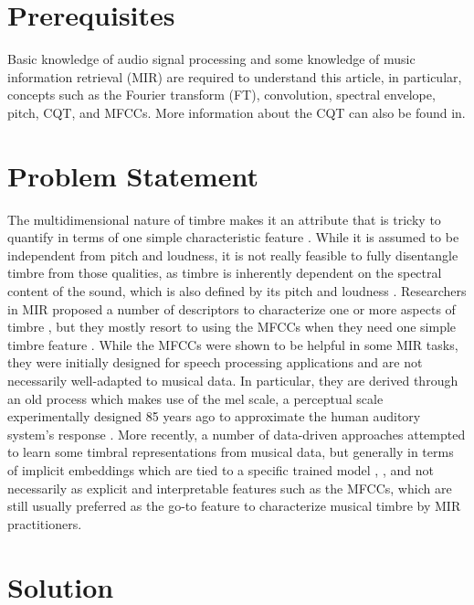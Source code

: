 \documentclass[journal]{IEEEtran}
\begin{document}
\section{Prerequisites}

Basic knowledge of audio signal processing and some knowledge of music information retrieval (MIR) \cite{mueller2007} are required to understand this article, in particular, concepts such as the Fourier transform (FT), convolution, spectral envelope, pitch, CQT, and MFCCs. More information about the CQT can also be found in\cite{brown1991, brown1992}.


\section{Problem Statement}

The multidimensional nature of timbre makes it an attribute that is tricky to quantify in terms of one simple characteristic feature \cite{grey1977}. While it is assumed to be independent from pitch and loudness, it is not really feasible to fully disentangle timbre from those qualities, as timbre is inherently dependent on the spectral content of the sound, which is also defined by its pitch and loudness \cite{moore2004}. Researchers in MIR proposed a number of descriptors to characterize one or more aspects of timbre \cite{peeters2011}, but they mostly resort to using the MFCCs when they need one simple timbre feature \cite{mueller2007}. While the MFCCs were shown to be helpful in some MIR tasks, they were initially designed for speech processing applications \cite{mermelstein1976} and are not necessarily well-adapted to musical data. In particular, they are derived through an old process which makes use of the mel scale, a perceptual scale experimentally designed 85 years ago to approximate the human auditory system's response \cite{stevens1937}. More recently, a number of data-driven approaches attempted to learn some timbral representations from musical data, but generally in terms of implicit embeddings which are tied to a specific trained model \cite{engel2017}, \cite{pons2017}, and not necessarily as explicit and interpretable features such as the MFCCs, which are still usually preferred as the go-to feature to characterize musical timbre by MIR practitioners.


\section{Solution}
\end{document}

